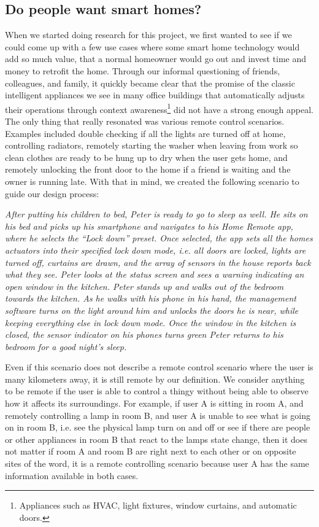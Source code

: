\documentclass{ubicomp2012}
\begin{document}
\subsection{Do people want smart homes?}
When we started doing research for this project, we first wanted to see if we could come up with a few use cases where some smart home technology would add so much value, that a normal homeowner would go out and invest time and money to retrofit the home. Through our informal questioning of friends, colleagues, and family, it quickly became clear that the promise of the classic intelligent appliances we see in many office buildings that automatically adjusts their operations through context awareness\footnote{Appliances such as HVAC, light fixtures, window curtains, and automatic doors.} did not have a strong enough appeal. The only thing that really resonated was various remote control scenarios. Examples included double checking if all the lights are turned off at home, controlling radiators, remotely starting the washer when leaving from work so clean clothes are ready to be hung up to dry when the user gets home, and remotely unlocking the front door to the home if a friend is waiting and the owner is running late. With that in mind,  we created the following scenario to guide our design process:

\textit{After putting his children to bed, Peter is ready to go to sleep as well. He sits on his bed and picks up his smartphone and navigates to his Home Remote app, where he selects the ``Lock down'' preset. Once selected, the app sets all the homes  actuators into their specified lock down mode, i.e. all doors are locked, lights are turned off, curtains are drawn, and the array of sensors in the house reports back what they see. Peter looks at the status screen and sees a warning indicating an open window in the kitchen. Peter stands up and walks out of the bedroom towards the kitchen. As he walks with his phone in his hand, the management software turns on the light around him and unlocks the doors he is near, while keeping everything else in lock down mode. Once the window in the kitchen is closed, the sensor indicator on his phones turns green Peter returns to his bedroom for a good night's sleep.}

Even if this scenario does not describe a remote control scenario where the user is many kilometers away, it is still remote by our definition. We consider anything to be remote if the user is able to control a thingy without being able to observe how it affects its surroundings. For example,  if user A is sitting in room A, and remotely controlling a lamp in room B, and user A is unable to see what is going on in room B, i.e. see the physical lamp turn on and off or see if there are people or other appliances in room B that react to the lamps state change, then it does not matter if room A and room B are right next to each other or on opposite sites of the word, it is a remote controlling scenario because user A has the same information available in both cases.
\end{document}
